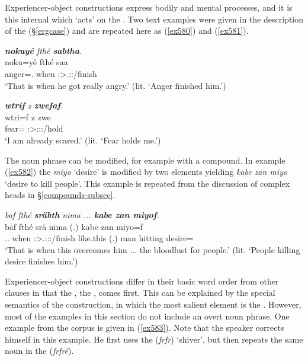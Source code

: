 Experiencer-object constructions express bodily and mental processes, and it is this internal  which `acts' on the . Two text examples were given in the description of the   ({\S}\ref{ergcase}) and are repeated here as (\ref{ex580}) and (\ref{ex581}).

\begin{exe}
	\ex \emph{\textbf{nokuyé} fthé \textbf{sabtha}.}\\
	\gll noku=yé fthé saa\\
	anger=\Erg.{\Nsg} when \Stsg:\Sbj>\Tsg.\Masc:\Pst:\Pfv/finish\\
	\trans `That is when he got really angry.' (lit. `Anger finished him.')\\
	\label{ex580}
\end{exe}

\begin{exe}
	\ex \emph{\textbf{wtrif} z \textbf{zwefaf}.}\\
	\gll wtri=f z zwe\\
	fear={\Erg} {\Iam} \Stsg:\Sbj>\Fsg:\Obj:\Rpst:\Pfv/hold\\
	\trans `I am already scared.' (lit. `Fear holds me.')
	\label{ex581}
\end{exe}

The  noun phrase can be modified, for example with a  compound. In example (\ref{ex582}) the  \emph{miyo} `desire' is modified by two elements yielding \emph{kabe zan miyo} `desire to kill people'. This example is repeated from the discussion of complex heads in {\S}\ref{compounds-subsec}.

\begin{exe}
	\ex \emph{baf fthé \textbf{sräbth} nima ... \textbf{kabe zan miyof}.}\\
	\gll baf fthé srä nima (.) kabe zan miyo=f\\
	\Recog.\Erg.{\Sg} when \Stsg:\Sbj>\Tsg.\Masc:\Obj:\Irr:\Pfv/finish like.this (.) man hitting desire=\Erg\\
	\trans `That is when this overcomes him ... the bloodlust for people.' (lit. `People killing desire finishes him.')
	\label{ex582}
\end{exe}

Experiencer-object constructions differ in their basic word order from other clauses in that the , the , comes first. This can be explained by the special semantics of the  construction, in which the most salient element is the . However, most of the examples in this section do not include an overt noun phrase. One example from the corpus is given in (\ref{ex583}). Note that the speaker corrects himself in this example. He first uses the  (\emph{frfr}) `shiver', but then repeats the same noun in the  (\emph{frfré}).

